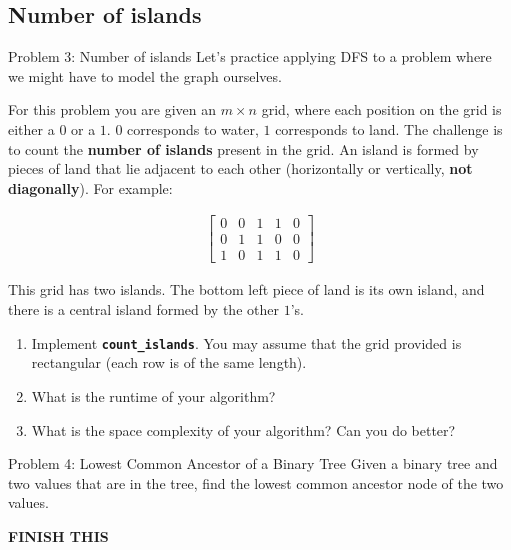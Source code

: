 \documentclass{article}
\begin{document}
\newpage

\subsection{Number of islands}
\begin{problem}{Problem 3: Number of islands}
    Let's practice applying DFS to a problem where we might have to model the graph ourselves. 
    
    For this problem you are given an $m \times n$ grid, where each position on the grid is either a $0$ or a $1$. $0$ corresponds to water, $1$ corresponds to land. The challenge is to count the \textbf{number of islands} present in the grid. An island is formed by pieces of land that lie adjacent to each other (horizontally or vertically, \textbf{not diagonally}). For example:

    \begin{align*}
        \begin{bmatrix}
        0 & 0 & 1 & 1 & 0 \\
        0 & 1 & 1 & 0 & 0 \\
        1 & 0 & 1 & 1 & 0
        \end{bmatrix}
    \end{align*}

    This grid has two islands. The bottom left piece of land is its own island, and there is a central island formed by the other $1$'s.

    \begin{enumerate}
        \item[a)] Implement \textbf{\lstinline{count_islands}}. You may assume that the grid provided is rectangular (each row is of the same length).
        \item[b)] What is the runtime of your algorithm?
        \item[c)] What is the space complexity of your algorithm? Can you do better?
    \end{enumerate}
\end{problem}

\newpage 

\begin{problem}{Problem 4: Lowest Common Ancestor of a Binary Tree}
    Given a binary tree and two values that are in the tree, find the lowest common ancestor node of the two values. 

    \textbf{FINISH THIS}
\end{problem}

\newpage 
\end{document}
